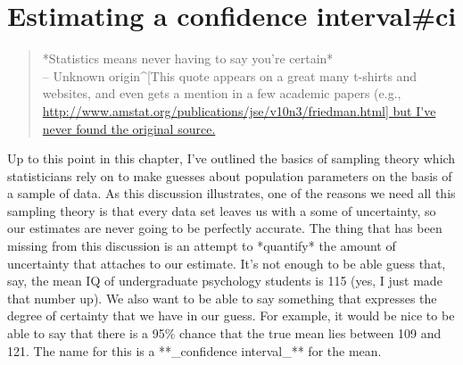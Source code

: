 \section{Estimating a confidence interval{#ci}}


\begin{quote}
*Statistics means never having to say you're certain* \\ \hspace*{2cm} -- Unknown origin^[This quote appears on a great many t-shirts and websites, and even gets a mention in a few academic papers (e.g., \url{http://www.amstat.org/publications/jse/v10n3/friedman.html] but I've never found the original source.}
\end{quote}

Up to this point in this chapter, I've outlined the basics of sampling theory which statisticians rely on to make guesses about population parameters on the basis of a sample of data. As this discussion illustrates, one of the reasons we need all this sampling theory is that every data set leaves us with a some of uncertainty, so our estimates are never going to be perfectly accurate. The thing that has been missing from this discussion is an attempt to *quantify* the amount of uncertainty that attaches to our estimate. It's not enough to be able guess that, say, the mean IQ of undergraduate psychology students is 115 (yes, I just made that number up). We also want to be able to say something that expresses the degree of certainty that we have in our guess. For example, it would be nice to be able to say that there is a 95\% chance that the true mean lies between 109 and 121. The name for this is a **_confidence interval_** for the mean.

